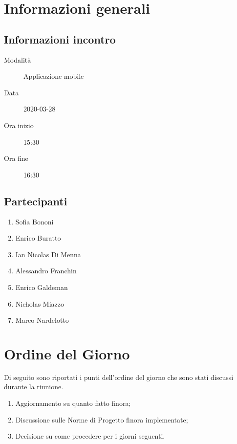 \documentclass{article}
\begin{document}


\section{Informazioni generali}%
\label{sec:informazioni_generali}

\subsection{Informazioni incontro}%
\label{sub:informazioni_incontro}

\begin{description}
  \item[Modalità] Applicazione mobile 
  \item[Data] 2020-03-28
  \item[Ora inizio] 15:30
  \item[Ora fine] 16:30
\end{description}

\subsection{Partecipanti}%
\label{sub:partecipanti}

\begin{enumerate}
  \item Sofia Bononi
  \item Enrico Buratto
  \item Ian Nicolas Di Menna
  \item Alessandro Franchin
  \item Enrico Galdeman
  \item Nicholas Miazzo
  \item Marco Nardelotto
\end{enumerate}

\section{Ordine del Giorno}%
\label{ordine_del_giorno}
Di seguito sono riportati i punti dell'ordine del giorno che sono stati discussi durante la riunione.
\begin{enumerate}
  \item Aggiornamento su quanto fatto finora;
  \item Discussione sulle Norme di Progetto finora implementate;
  \item Decisione su come procedere per i giorni seguenti.
\end{enumerate}
\end{document}
